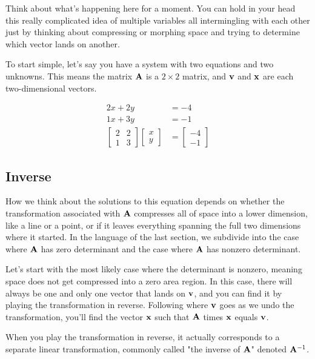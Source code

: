 Think about what's happening here for a moment. You can hold in your head this
really complicated idea of multiple variables all intermingling with each other
just by thinking about compressing or morphing space and trying to determine
which vector lands on another.

To start simple, let's say you have a system with two equations and two
unknowns. This means the matrix $\mathbf{A}$ is a $2 \times 2$ matrix, and
$\mathbf{v}$ and $\mathbf{x}$ are each two-dimensional vectors.

\begin{align*}
  2x + 2y &= -4 \\
  1x + 3y &= -1 \\
  \begin{bmatrix}
    2 & 2 \\
    1 & 3
  \end{bmatrix}
  \begin{bmatrix}
    x \\
    y
  \end{bmatrix} &=
  \begin{bmatrix}
    -4 \\
    -1
  \end{bmatrix}
\end{align*}

\subsection{Inverse}

How we think about the solutions to this equation depends on whether the
transformation associated with $\mathbf{A}$ compresses all of space into a lower
dimension, like a line or a point, or if it leaves everything spanning the full
two dimensions where it started. In the language of the last section, we
subdivide into the case where $\mathbf{A}$ has zero determinant and the case where
$\mathbf{A}$ has nonzero determinant.

Let's start with the most likely case where the determinant is nonzero, meaning
space does not get compressed into a zero area region. In this case, there will
always be one and only one vector that lands on $\mathbf{v}$, and you can find it
by playing the transformation in reverse. Following where $\mathbf{v}$ goes as we
undo the transformation, you'll find the vector $\mathbf{x}$ such that $\mathbf{A}$
times $\mathbf{x}$ equals $\mathbf{v}$.

When you play the transformation in reverse, it actually corresponds to a
separate linear transformation, commonly called "the inverse of $\mathbf{A}$"
denoted $\mathbf{A}^{-1}$.

